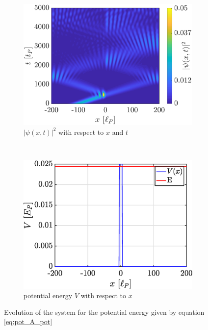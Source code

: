 \documentclass[a4paper,12pt,twoside]{article}
\begin{document}
        \begin{figure}[h]
          \centering
          \begin{subfigure}[t]{0.45\textwidth}
            \includegraphics[width=\textwidth]{graphs/v_pot_A_evo.eps}
            \caption{$|\psi(x, t)|^2$ with respect to $x$ and $t$}
            \label{fig:v_pot_A_evo}
          \end{subfigure}
          ~
          \begin{subfigure}[t]{0.45\textwidth}
            \includegraphics[width=\textwidth]{graphs/v_pot_A_pot.eps}
            \caption{potential energy $V$ with respect to $x$}
            \label{fig:v_pot_A_pot}
          \end{subfigure}
          \caption{Evolution of the system for the potential energy given by equation \eqref{eq:pot_A_pot}}
          \label{fig:v_pot_A}
        \end{figure}
\end{document}
